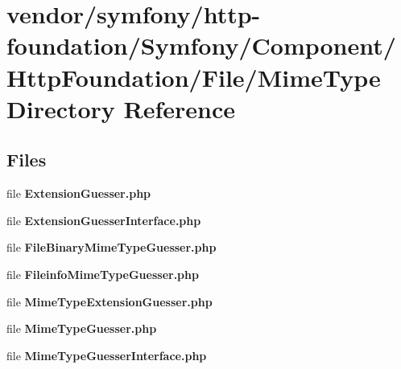 \section{vendor/symfony/http-\/foundation/\+Symfony/\+Component/\+Http\+Foundation/\+File/\+Mime\+Type Directory Reference}
\label{dir_b0baf7618c2f9a602fdffeed7ab38d56}
\subsection*{Files}
\begin{DoxyCompactItemize}
\item 
file {\bf Extension\+Guesser.\+php}
\item 
file {\bf Extension\+Guesser\+Interface.\+php}
\item 
file {\bf File\+Binary\+Mime\+Type\+Guesser.\+php}
\item 
file {\bf Fileinfo\+Mime\+Type\+Guesser.\+php}
\item 
file {\bf Mime\+Type\+Extension\+Guesser.\+php}
\item 
file {\bf Mime\+Type\+Guesser.\+php}
\item 
file {\bf Mime\+Type\+Guesser\+Interface.\+php}
\end{DoxyCompactItemize}
